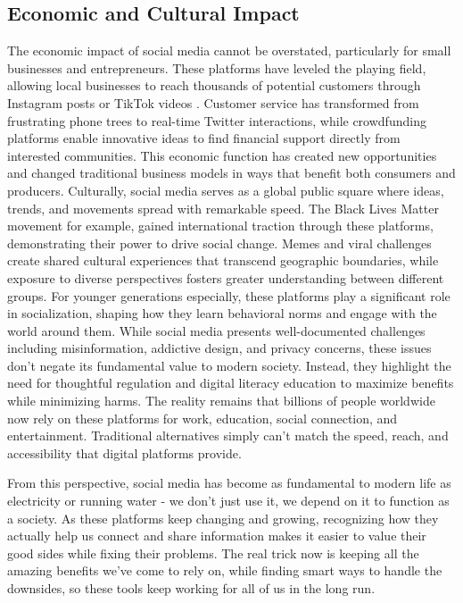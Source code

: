 \documentclass{article}
\begin{document}
\subsection{Economic and Cultural Impact}
The economic impact of social media cannot be overstated, particularly for small businesses and entrepreneurs. These platforms have leveled the playing field, allowing local businesses to reach thousands of potential customers through Instagram posts or TikTok videos \citep{reitz2012}. Customer service has transformed from frustrating phone trees to real-time Twitter interactions, while crowdfunding platforms enable innovative ideas to find financial support directly from interested communities. This economic function has created new opportunities and changed traditional business models in ways that benefit both consumers and producers. Culturally, social media serves as a global public square where ideas, trends, and movements spread with remarkable speed. The Black Lives Matter movement for example, gained international traction through these platforms, demonstrating their power to drive social change. Memes and viral challenges create shared cultural experiences that transcend geographic boundaries, while exposure to diverse perspectives fosters greater understanding between different groups. For younger generations especially, these platforms play a significant role in socialization, shaping how they learn behavioral norms and engage with the world around them. While social media presents well-documented challenges including misinformation, addictive design, and privacy concerns, these issues don't negate its fundamental value to modern society. Instead, they highlight the need for thoughtful regulation and digital literacy education to maximize benefits while minimizing harms. The reality remains that billions of people worldwide now rely on these platforms for work, education, social connection, and entertainment. Traditional alternatives simply can't match the speed, reach, and accessibility that digital platforms provide.

From this perspective, social media has become as fundamental to modern life as electricity or running water - we don't just use it, we depend on it to function as a society. As these platforms keep changing and growing, recognizing how they actually help us connect and share information makes it easier to value their good sides while fixing their problems. The real trick now is keeping all the amazing benefits we've come to rely on, while finding smart ways to handle the downsides, so these tools keep working for all of us in the long run.
\end{document}
